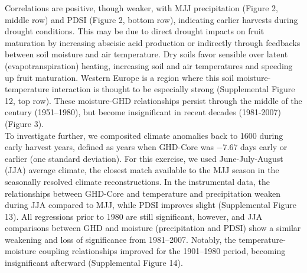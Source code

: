 \documentclass[final]{nature}
\begin{document}
\indent Correlations are positive, though weaker, with MJJ precipitation (Figure 2, middle row) and PDSI (Figure 2, bottom row), indicating earlier harvests during drought conditions. This may be due to direct drought impacts on fruit maturation by increasing abscisic acid production\cite{webb2012} or indirectly through feedbacks between soil moisture and air temperature. Dry soils favor sensible over latent (evapotranspiration) heating, increasing soil and air temperatures and speeding up fruit maturation. Western Europe is a region where this soil moisture-temperature interaction is thought to be especially strong\cite{Seneviratne2006} (Supplemental Figure 12, top row). These moisture-GHD relationships persist through the middle of the century (1951--1980), but become insignificant in recent decades (1981-2007) (Figure 3).\\
\indent To investigate further, we composited climate anomalies back to 1600 during early harvest years, defined as years when GHD-Core was $-7.67$ days early or earlier (one standard deviation). For this exercise, we used June-July-August (JJA) average climate, the closest match available to the MJJ season in the seasonally resolved climate reconstructions. In the instrumental data, the relationships between GHD-Core and temperature and precipitation weaken during JJA compared to MJJ, while PDSI improves slight (Supplemental Figure 13). All regressions prior to 1980 are still significant, however, and JJA comparisons between GHD and moisture (precipitation and PDSI) show a similar weakening and loss of significance from 1981--2007. Notably, the temperature-moisture coupling relationships improved for the 1901--1980 period, becoming insignificant afterward (Supplemental Figure 14).\\
\end{document}
